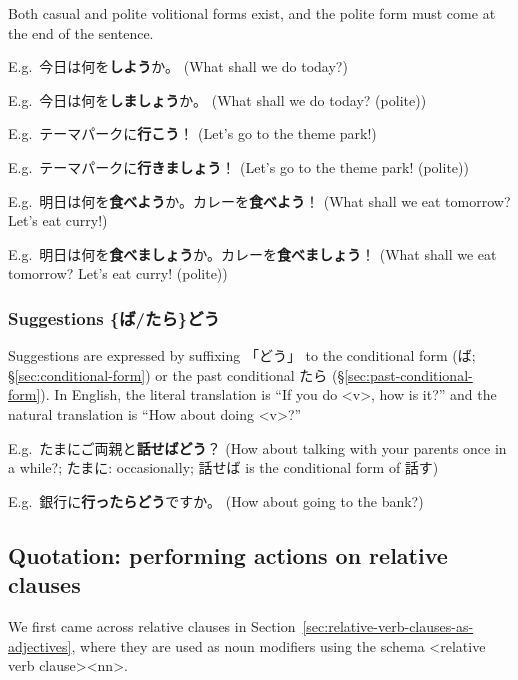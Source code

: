 \documentclass[../nihongo-gakushuu-kyouzai.tex]{subfiles}
\begin{document}
Both casual and polite volitional forms exist, and the polite form must come at the end of the sentence.


E.g.\ 今日は何を\textbf{しよう}か。 (What shall we do today?)

E.g.\ 今日は何を\textbf{しましょう}か。 (What shall we do today? (polite))

E.g.\ テーマパークに\textbf{行こう}！ (Let's go to the theme park!)

E.g.\ テーマパークに\textbf{行きましょう}！ (Let's go to the theme park! (polite))

E.g.\ 明日は何を\textbf{食べよう}か。カレーを\textbf{食べよう}！ (What shall we eat tomorrow? Let's eat curry!)

E.g.\ 明日は何を\textbf{食べましょう}か。カレーを\textbf{食べましょう}！ (What shall we eat tomorrow? Let's eat curry! (polite))


\subsubsection{Suggestions \{ば/たら\}どう} \label{sec:suggestions}
Suggestions are expressed by suffixing 「どう」 to the conditional form (ば; \S\ref{sec:conditional-form}) or the past conditional たら (\S\ref{sec:past-conditional-form}). In English, the literal translation is ``If you do <v>, how is it?'' and the natural translation is ``How about doing <v>?''


E.g.\ たまにご両親と\textbf{話せばどう}？ (How about talking with your parents once in a while?; たまに: occasionally; 話せば is the conditional form of 話す)

E.g.\ 銀行に\textbf{行ったらどう}ですか。 (How about going to the bank?)


\subsection{Quotation: performing actions on relative clauses}

We first came across relative clauses in Section~\ref{sec:relative-verb-clauses-as-adjectives}, where they are used as noun modifiers using the schema <relative verb clause><nn>.
\end{document}
